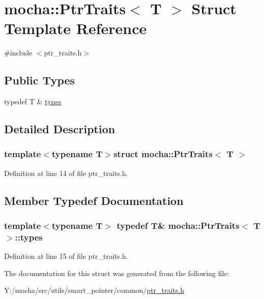 \hypertarget{structmocha_1_1_ptr_traits}{
\section{mocha::PtrTraits$<$ T $>$ Struct Template Reference}
\label{structmocha_1_1_ptr_traits}
}


{\ttfamily \#include $<$ptr\_\-traits.h$>$}

\subsection*{Public Types}
\begin{DoxyCompactItemize}
\item 
typedef T \& \hyperlink{structmocha_1_1_ptr_traits_ac54900a25f184757721fa8de94f37e4e}{types}
\end{DoxyCompactItemize}


\subsection{Detailed Description}
\subsubsection*{template$<$typename T$>$struct mocha::PtrTraits$<$ T $>$}



Definition at line 14 of file ptr\_\-traits.h.



\subsection{Member Typedef Documentation}
\hypertarget{structmocha_1_1_ptr_traits_ac54900a25f184757721fa8de94f37e4e}{
\subsubsection[{types}]{\setlength{\rightskip}{0pt plus 5cm}template$<$typename T$>$ typedef T\& {\bf mocha::PtrTraits}$<$ T $>$::{\bf types}}}
\label{structmocha_1_1_ptr_traits_ac54900a25f184757721fa8de94f37e4e}


Definition at line 15 of file ptr\_\-traits.h.



The documentation for this struct was generated from the following file:\begin{DoxyCompactItemize}
\item 
Y:/mocha/src/utils/smart\_\-pointer/common/\hyperlink{ptr__traits_8h}{ptr\_\-traits.h}\end{DoxyCompactItemize}
